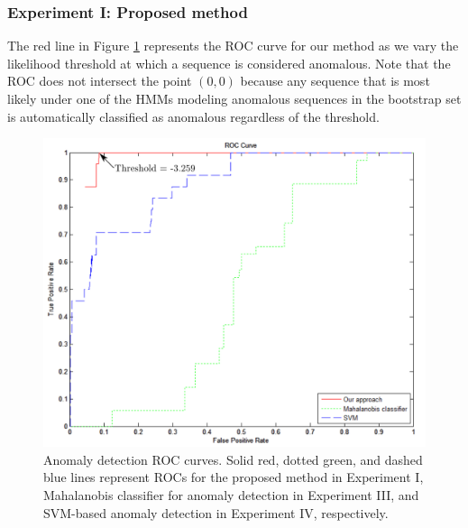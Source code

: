 \subsubsection{Experiment I: Proposed method}

The red line in Figure \ref{fig:batch-roc-results} represents the ROC
curve for our method as we vary the likelihood threshold at which a
sequence is considered anomalous.  Note that the ROC does not
intersect the point $(0, 0)$ because any sequence that is most likely
under one of the HMMs modeling anomalous sequences in the bootstrap
set is automatically classified as anomalous regardless of the
threshold.

\begin{figure}[t]
  \centering
  \includegraphics[width=0.8\linewidth]{figures/roc-ours-vs-ml-results}
  \caption[Anomaly detection ROC curves. Solid red, dotted green, and dashed 
    blue lines represent ROCs for the proposed method in Experiment I, 
    Mahalanobis classifier for anomaly detection in Experiment III, 
    and SVM-based anomaly
    detection in Experiment IV, respectively.]{\small Anomaly
    detection ROC curves. Solid red, dotted green, and dashed blue lines 
    represent ROCs for the proposed method in Experiment I, Mahalanobis 
    classifier for anomaly
    detection in Experiment III, and SVM-based anomaly detection 
    in Experiment IV, respectively.}
  \label{fig:batch-roc-results}
\end{figure}

